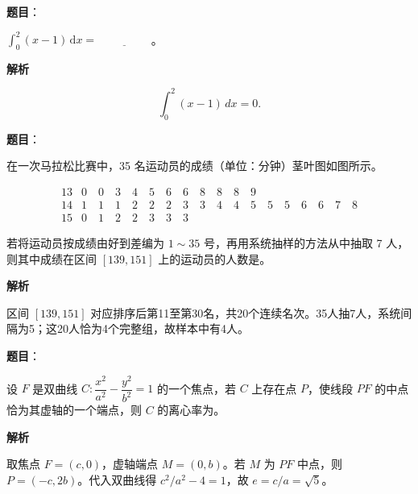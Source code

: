 \begin{answer}

\textbf{题目}：

\(\displaystyle\int_0^2(x-1)\,\mathrm dx=\underline{\hspace{2cm}}\)。

\textbf{解析}

\nopagebreak[4]
\[
\int_0^2(x-1)\,dx=0.
\]


\end{answer}
\begin{answer}

\textbf{题目}：

在一次马拉松比赛中，35 名运动员的成绩（单位：分钟）茎叶图如图所示。

\nopagebreak[4]
\[
\begin{array}{c|l}
13 & 0\quad0\quad3\quad4\quad5\quad6\quad6\quad8\quad8\quad8\quad9\\
14 & 1\quad1\quad1\quad2\quad2\quad2\quad3\quad3\quad4\quad4\quad5\quad5\quad5\quad6\quad6\quad7\quad8\\
15 & 0\quad1\quad2\quad2\quad3\quad3\quad3
\end{array}
\]

若将运动员按成绩由好到差编为 \(1\sim35\) 号，再用系统抽样的方法从中抽取 7 人，则其中成绩在区间 \([139,151]\) 上的运动员的人数是\gkblank{}。

\textbf{解析}

区间 \([139,151]\) 对应排序后第11至第30名，共20个连续名次。35人抽7人，系统间隔为5；这20人恰为4个完整组，故样本中有4人。


\end{answer}
\begin{answer}

\textbf{题目}：

设 \(F\) 是双曲线 \(C:\dfrac{x^2}{a^2}-\dfrac{y^2}{b^2}=1\) 的一个焦点，若 \(C\) 上存在点 \(P\)，使线段 \(PF\) 的中点恰为其虚轴的一个端点，则 \(C\) 的离心率为\gkblank{}。

\textbf{解析}

取焦点 \(F=(c,0)\)，虚轴端点 \(M=(0,b)\)。若 \(M\) 为 \(PF\) 中点，则 \(P=(-c,2b)\)。代入双曲线得 \(c^2/a^2-4=1\)，故 \(e=c/a=\sqrt5\)。


\end{answer}
